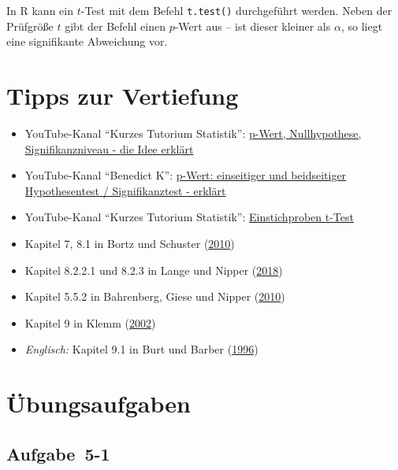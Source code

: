 \documentclass[
  11pt,
  ngerman,
  a4paper,
]{report}
\providecommand{\tightlist}{%
  \setlength{\itemsep}{0pt}\setlength{\parskip}{0pt}}
\newenvironment{rtip}{
  \medskip
  \begin{tcolorbox}[colframe=purple,colback=light_gray,title=Softwarehinweis]
}{
  \end{tcolorbox}
  \medskip
}
\begin{document}
\begin{rtip}
In R kann ein $t$-Test mit dem Befehl \verb|t.test()| durchgeführt werden. Neben der Prüfgröße $t$ gibt der Befehl einen $p$-Wert aus -- ist dieser kleiner als $\alpha$, so liegt eine signifikante Abweichung vor.
\end{rtip}

\hypertarget{tipps-zur-vertiefung-4}{%
\section*{Tipps zur Vertiefung}\label{tipps-zur-vertiefung-4}}

\begin{itemize}
\tightlist
\item
  YouTube-Kanal \enquote{Kurzes Tutorium Statistik}: \href{https://www.youtube.com/watch?v=gSyGVDMcg-U}{p-Wert, Nullhypothese, Signifikanzniveau - die Idee erklärt}
\item
  YouTube-Kanal \enquote{Benedict K}: \href{https://www.youtube.com/watch?v=sNlxShUM4io}{p-Wert: einseitiger und beidseitiger Hypothesentest / Signifikanztest - erklärt}
\item
  YouTube-Kanal \enquote{Kurzes Tutorium Statistik}: \href{https://www.youtube.com/watch?v=rbYg5IsOYaM}{Einstichproben t-Test}
\item
  Kapitel 7, 8.1 in Bortz und Schuster (\protect\hyperlink{ref-bortz}{2010})
\item
  Kapitel 8.2.2.1 und 8.2.3 in Lange und Nipper (\protect\hyperlink{ref-delange}{2018})
\item
  Kapitel 5.5.2 in Bahrenberg, Giese und Nipper (\protect\hyperlink{ref-bahrenberg}{2010})
\item
  Kapitel 9 in Klemm (\protect\hyperlink{ref-klemm}{2002})
\item
  \emph{Englisch:} Kapitel 9.1 in Burt und Barber (\protect\hyperlink{ref-burt}{1996})
\end{itemize}

\hypertarget{uxfcbungsaufgaben-4}{%
\section*{Übungsaufgaben}\label{uxfcbungsaufgaben-4}}

\nopagebreak

\hypertarget{aufgabe-5-1}{%
\subsection{Aufgabe~5-1}\label{aufgabe-5-1}}
\end{document}

